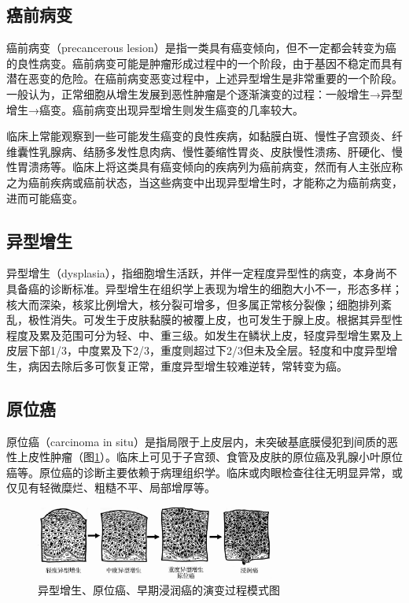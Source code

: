 \subsection{癌前病变}

癌前病变（precancerous
lesion）是指一类具有癌变倾向，但不一定都会转变为癌的良性病变。癌前病变可能是肿瘤形成过程中的一个阶段，由于基因不稳定而具有潜在恶变的危险。在癌前病变恶变过程中，上述异型增生是非常重要的一个阶段。一般认为，正常细胞从增生发展到恶性肿瘤是个逐渐演变的过程：一般增生→异型增生→癌变。癌前病变出现异型增生则发生癌变的几率较大。

临床上常能观察到一些可能发生癌变的良性疾病，如黏膜白斑、慢性子宫颈炎、纤维囊性乳腺病、结肠多发性息肉病、慢性萎缩性胃炎、皮肤慢性溃疡、肝硬化、慢性胃溃疡等。临床上将这类具有癌变倾向的疾病列为癌前病变，然而有人主张应称之为癌前疾病或癌前状态，当这些病变中出现异型增生时，才能称之为癌前病变，进而可能癌变。

\subsection{异型增生}

异型增生（dysplasia），指细胞增生活跃，并伴一定程度异型性的病变，本身尚不具备癌的诊断标准。异型增生在组织学上表现为增生的细胞大小不一，形态多样；核大而深染，核浆比例增大，核分裂可增多，但多属正常核分裂像；细胞排列紊乱，极性消失。可发生于皮肤黏膜的被覆上皮，也可发生于腺上皮。根据其异型性程度及累及范围可分为轻、中、重三级。如发生在鳞状上皮，轻度异型增生累及上皮层下部1/3，中度累及下2/3，重度则超过下2/3但未及全层。轻度和中度异型增生，病因去除后多可恢复正常，重度异型增生较难逆转，常转变为癌。

\subsection{原位癌}

原位癌（carcinoma in
situ）是指局限于上皮层内，未突破基底膜侵犯到间质的恶性上皮性肿瘤（图\ref{fig5-19}）。临床上可见于子宫颈、食管及皮肤的原位癌及乳腺小叶原位癌等。原位癌的诊断主要依赖于病理组织学。临床或肉眼检查往往无明显异常，或仅见有轻微糜烂、粗糙不平、局部增厚等。

\begin{figure}[!htbp]
  \centering
  \includegraphics[width=0.7\textwidth]{./images/Image00088.jpg}
  \caption{异型增生、原位癌、早期浸润癌的演变过程模式图}
  \label{fig5-19}
\end{figure}

